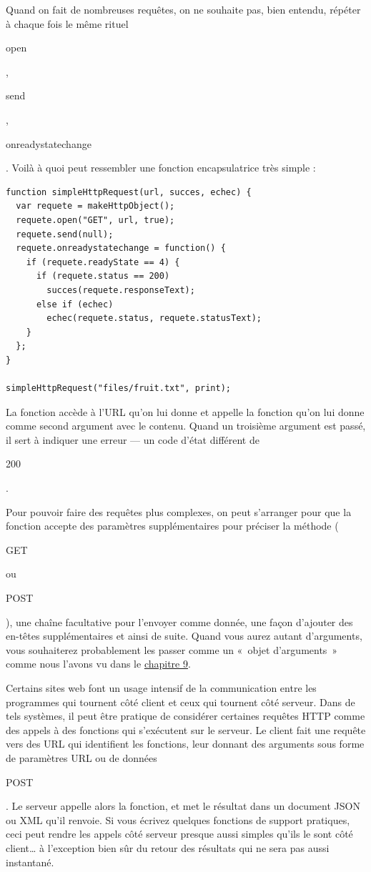 \documentclass{FramateX}
\renewcommand{\texttt}[1]{\begin{sffamily}{#1}\end{sffamily}}
\begin{document}
\begin{center}\end{center}

Quand on fait de nombreuses requêtes, on ne souhaite pas, bien entendu,
répéter à chaque fois le même rituel \texttt{open}, \texttt{send},
\texttt{onreadystatechange}. Voilà à quoi peut ressembler une fonction
encapsulatrice très simple :

\begin{lstlisting}
function simpleHttpRequest(url, succes, echec) {
  var requete = makeHttpObject();
  requete.open("GET", url, true);
  requete.send(null);
  requete.onreadystatechange = function() {
    if (requete.readyState == 4) {
      if (requete.status == 200)
        succes(requete.responseText);
      else if (echec)
        echec(requete.status, requete.statusText);
    }
  };
}

simpleHttpRequest("files/fruit.txt", print);
\end{lstlisting}
La fonction accède à l'URL qu'on lui donne et appelle la fonction qu'on
lui donne comme second argument avec le contenu. Quand un troisième
argument est passé, il sert à indiquer une erreur --- un code d'état
différent de \texttt{200}.

Pour pouvoir faire des requêtes plus complexes, on peut s'arranger pour
que la fonction accepte des paramètres supplémentaires pour préciser la
méthode (\texttt{GET} ou \texttt{POST}), une chaîne facultative pour
l'envoyer comme donnée, une façon d'ajouter des en-têtes supplémentaires
et ainsi de suite. Quand vous aurez autant d'arguments, vous souhaiterez
probablement les passer comme un «~objet d'arguments~» comme nous
l'avons vu dans le \href{chapter9.html}{chapitre 9}.

\begin{center}\end{center}

Certains sites web font un usage intensif de la communication entre les
programmes qui tournent côté client et ceux qui tournent côté serveur.
Dans de tels systèmes, il peut être pratique de considérer certaines
requêtes HTTP comme des appels à des fonctions qui s'exécutent sur le
serveur. Le client fait une requête vers des URL qui identifient les
fonctions, leur donnant des arguments sous forme de paramètres URL ou de
données \texttt{POST}. Le serveur appelle alors la fonction, et met le
résultat dans un document JSON ou XML qu'il renvoie. Si vous écrivez
quelques fonctions de support pratiques, ceci peut rendre les appels
côté serveur presque aussi simples qu'ils le sont côté client\ldots{} à
l'exception bien sûr du retour des résultats qui ne sera pas aussi
instantané.
\end{document}
